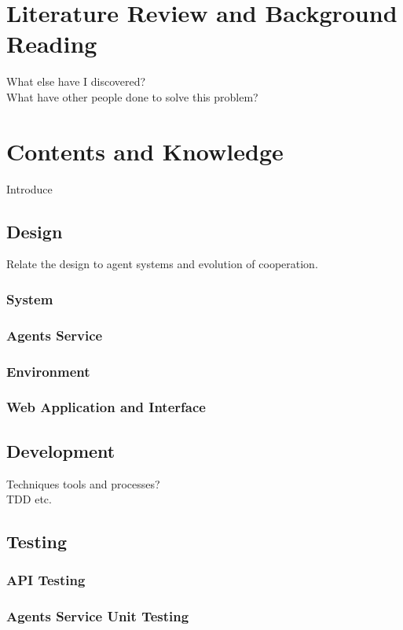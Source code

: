 \documentclass[]{final_report}
\begin{document}
\chapter{Literature Review and Background Reading}
What else have I discovered?\\
What have other people done to solve this problem?~\cite{Mui:2002:NRM:544741.544807}

\chapter{Contents and Knowledge}
Introduce
\section{Design}
Relate the design to agent systems and evolution of cooperation.	
\subsection{System}

\subsection{Agents Service}

\subsection{Environment}

\subsection{Web Application and Interface}

\section{Development}
Techniques tools and processes?\\
TDD etc.

\section{Testing}
\subsection{API Testing}

\subsection{Agents Service Unit Testing}
\end{document}
